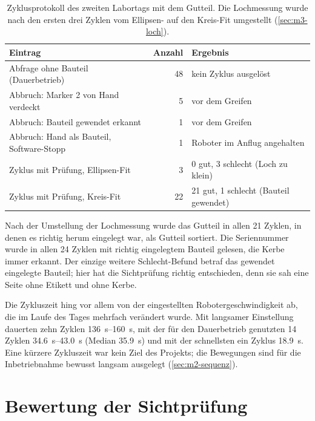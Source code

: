 \begin{table}[htbp]
  \centering
  \caption[Zyklusprotokoll des zweiten Labortags]{Zyklusprotokoll des zweiten Labortags mit dem
  Gutteil. Die Lochmessung wurde nach den ersten drei Zyklen vom Ellipsen- auf den Kreis-Fit
  umgestellt (\cref{sec:m3-loch}).}
  \label{tab:eval-protokoll}
  \begin{tabular}{@{}l r l@{}}
    \toprule
    Eintrag & Anzahl & Ergebnis \\
    \midrule
    Abfrage ohne Bauteil (Dauerbetrieb)        & 48 & kein Zyklus ausgelöst \\
    Abbruch: Marker 2 von Hand verdeckt          & 5  & vor dem Greifen \\
    Abbruch: Bauteil gewendet erkannt            & 1  & vor dem Greifen \\
    Abbruch: Hand als Bauteil, Software-Stopp    & 1  & Roboter im Anflug angehalten \\
    \midrule
    Zyklus mit Prüfung, Ellipsen-Fit             & 3  & 0 gut, 3 schlecht (Loch zu klein) \\
    Zyklus mit Prüfung, Kreis-Fit                & 22 & 21 gut, 1 schlecht (Bauteil gewendet) \\
    \bottomrule
  \end{tabular}
\end{table}

Nach der Umstellung der Lochmessung wurde das Gutteil in allen 21 Zyklen, in denen es richtig
herum eingelegt war, als Gutteil sortiert. Die Seriennummer wurde in allen 24 Zyklen mit richtig
eingelegtem Bauteil gelesen, die Kerbe immer erkannt. Der einzige weitere Schlecht-Befund betraf
das gewendet eingelegte Bauteil; hier hat die Sichtprüfung richtig entschieden, denn sie sah
eine Seite ohne Etikett und ohne Kerbe.

Die Zykluszeit hing vor allem von der eingestellten Robotergeschwindigkeit ab, die im Laufe
des Tages mehrfach verändert wurde. Mit langsamer Einstellung dauerten zehn Zyklen
\SIrange{136}{160}{\second}, mit der für den Dauerbetrieb genutzten 14 Zyklen
\SIrange{34,6}{43,0}{\second} (Median \SI{35,9}{\second}) und mit der schnellsten ein Zyklus
\SI{18,9}{\second}. Eine kürzere Zykluszeit war kein Ziel des
Projekts; die Bewegungen sind für die Inbetriebnahme bewusst langsam ausgelegt
(\cref{sec:m2-sequenz}).

\section{Bewertung der Sichtprüfung}
\label{sec:eval-pruefung}

